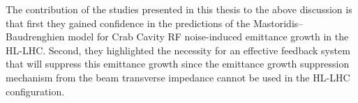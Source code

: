 
The contribution of the studies presented in this thesis to the above discussion is that first they gained confidence in the predictions of the Mastoridis--Baudrenghien model for Crab Cavity RF noise-induced emittance growth in the HL-LHC. Second, they highlighted the necessity for an effective feedback system that will suppress this emittance growth since the emittance growth suppression mechanism from the beam transverse impedance cannot be used in the HL-LHC configuration. 




